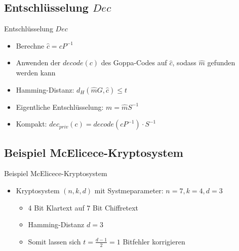 \documentclass[11pt%
,aspectratio=169%
]{beamer}
\begin{document}
\subsection{Entschlüsselung $Dec$}
\begin{frame}{Entschlüsselung $Dec$}
    \begin{itemize}
        \item Berechne $\hat{c} = cP^{-1}$
        \item Anwenden der $decode(c)$ des Goppa-Codes auf $\hat{c}$, sodass $\hat{m}$ gefunden werden kann
        \item Hamming-Distanz: $d_H(\hat{m}G, \hat{c}) \leq t$
        \item Eigentliche Entschlüsselung: $m = \hat{m}S^{-1}$
        \item Kompakt: $dec_{priv}(c) = decode(cP^{-1}) \cdot S^{-1}$
    \end{itemize}    
\end{frame}

\subsection{Beispiel McElicece-Kryptosystem}
\begin{frame}{Beispiel McElicece-Kryptosystem}
    \begin{itemize}
        \item Kryptosystem $(n,k,d)$ mit Systmeparameter: $n=7, k=4, d=3$
        \begin{itemize}
            \item 4 Bit Klartext auf $7$ Bit Chiffretext
            \item Hamming-Distanz $d=3$
            \item Somit lassen sich $t = \frac{d-1}{2} = 1$ Bitfehler korrigieren
        \end{itemize}
    \end{itemize}
\end{frame}
\end{document}
